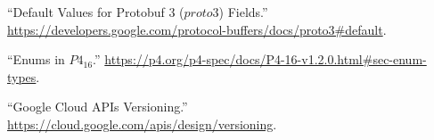 \documentclass[11pt]{article}
\begin{document}
{{\begin{thebibliography}{37}
\mdbibitemlabel{{}[4]}\textquotedblleft{}Default Values for Protobuf 3 ($proto3$) Fields.\textquotedblright{} \href{https://developers.google.com/protocol-buffers/docs/proto3\%23default}{{\ttfamily https://\hspace{0pt}developers.\hspace{0pt}google.\hspace{0pt}com/\hspace{0pt}protocol-\hspace{0pt}buffers/\hspace{0pt}docs/\hspace{0pt}proto3\#\hspace{0pt}default}}.\label{protodefaults}%

\mdbibitemlabel{{}[5]}\textquotedblleft{}Enums in $P4_{16}$.\textquotedblright{} \href{https://p4.org/p4-spec/docs/P4-16-v1.2.0.html\%23sec-enum-types}{{\ttfamily https://\hspace{0pt}p4.\hspace{0pt}org/\hspace{0pt}p4-\hspace{0pt}spec/\hspace{0pt}docs/\hspace{0pt}P4-\hspace{0pt}16-\hspace{0pt}v1.\hspace{0pt}2.\hspace{0pt}0.\hspace{0pt}html\#\hspace{0pt}sec-\hspace{0pt}enum-\hspace{0pt}types}}.\label{p4enums}%

\mdbibitemlabel{{}[6]}\textquotedblleft{}Google Cloud APIs Versioning.\textquotedblright{} \href{https://cloud.google.com/apis/design/versioning}{{\ttfamily https://\hspace{0pt}cloud.\hspace{0pt}google.\hspace{0pt}com/\hspace{0pt}apis/\hspace{0pt}design/\hspace{0pt}versioning}}.\label{apiversioning}%


\end{thebibliography}}}
\end{document}
